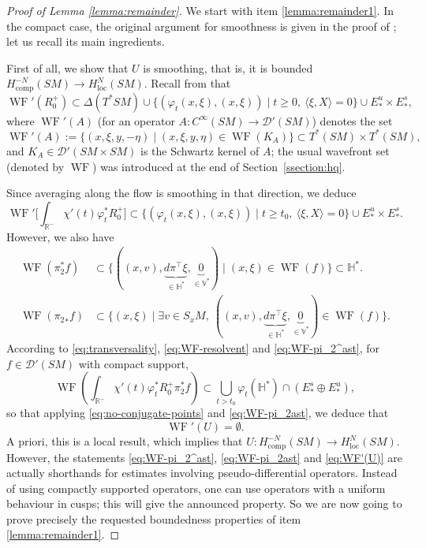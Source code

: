 \documentclass[JEP,XML,SOM,Unicode,NoFloatCountersInSection]{cedram}
\newcommand{\R}{\mathbb{R}}
\newcommand{\V}{\mathbb{V}}
\newcommand{\HH}{\mathbb{H}}
\newcommand{\mc}{\mathcal}
\DeclareMathOperator{\WF}{WF}
\theoremstyle{plain}
\theoremstyle{definition}
\begin{document}
\begin{proof}[Proof of Lemma \ref{lemma:remainder}]
We start with item \eqref{lemma:remainder1}. In the compact case, the original argument for smoothness is given in the proof of \cite[Th.\,3.1]{Guillarmou-17-1}; let us recall its main ingredients.

First of all, we show that $U$ is smoothing, that is, it is bounded $H^{-N}_{\mathrm{comp}}(SM) \to H^{N}_{\mathrm{loc}}(SM)$. Recall from \cite[Th.\,3]{Bonthonneau-Weich-17} that
\begin{equation}\label{eq:WF-resolvent}
\WF'(R_0^+) \subset \Delta(T^\ast SM) \cup \{ (\varphi_t(x,\xi),(x,\xi))\mid t\geq 0,\ \langle \xi, X\rangle = 0 \} \cup E^u_\ast \times E^s_\ast,
\end{equation}
{\color{black}where $\WF'(A)$ (for an operator $A : C^\infty(SM) \to \mc{D}'(SM)$) denotes the set
\[
\WF'(A) := \{ (x,\xi,y,-\eta) \mid (x,\xi,y,\eta) \in \WF(K_A)\} \subset T^*(SM) \times T^*(SM),
\]
and $K_A \in \mc{D}'(SM \times SM)$ is the Schwartz kernel of $A$; the usual wavefront set (denoted by $\WF$) was introduced at the end of Section~\ref{ssection:hq}.}

Since averaging along the flow is smoothing in that direction, we deduce
\[
\WF'\biggl[ \int_{\R^-} \chi'(t) \varphi_t^\ast R_0^+ \biggr] \subset \{ (\varphi_t(x,\xi),(x,\xi))\mid t\geq t_0,\ \langle \xi, X\rangle = 0 \} \cup E^u_\ast \times E^s_\ast.
\]
However, we also have
\begin{align}
\WF(\pi_2^\ast f) &\subset \{ ((x,v),\underbrace{d\pi^\top\xi}_{\in \HH^*}, \underbrace{0}_{\in \V^*})\mid (x,\xi) \in \WF(f)\}\subset \HH^\ast.\label{eq:WF-pi_2^ast}\\
\WF({\pi_2}_\ast f) &\subset \{ (x,\xi)\mid \exists v\in S_x M,\ ((x,v),\underbrace{d\pi^\top\xi}_{\in \HH^*}, \underbrace{0}_{\in \V^*}) \in \WF(f)\}.\label{eq:WF-pi_2ast}
\end{align}
According to \eqref{eq:transversality}, \eqref{eq:WF-resolvent} and \eqref{eq:WF-pi_2^ast}, for $f\in \mathcal{D}'(SM)$ with compact support,
\[
\WF\left(\int_{\R^-} \chi'(t) \varphi_t^\ast R_0^+ \pi_2^\ast f\right) \subset \bigcup_{t>t_0} \varphi_{t}(\HH^\ast) \cap (E^s_* \oplus E^u_*),
\]
so that applying \eqref{eq:no-conjugate-points} and \eqref{eq:WF-pi_2ast}, we deduce that
\begin{equation}\label{eq:WF'(U)}
\WF'(U) = \emptyset.
\end{equation}
A priori, this is a local result, which implies that $U : H^{-N}_{\mathrm{comp}}(SM)\to H^N_{\mathrm{loc}}(SM)$. However, the statements \eqref{eq:WF-pi_2^ast}, \eqref{eq:WF-pi_2ast} and \eqref{eq:WF'(U)} are actually shorthands for estimates involving pseudo-differential operators. Instead of using compactly supported operators, one can use operators with a uniform behaviour in cusps; this will give the announced property. So we are now going to prove precisely the requested boundedness properties of item \eqref{lemma:remainder1}.


\end{proof}
\end{document}
